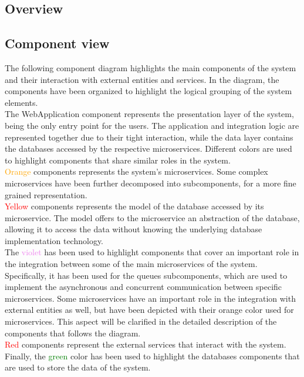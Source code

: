 \subsection{Overview}
\subsection{Component view}
The following component diagram highlights the main components of the system and their interaction with external entities and services. In the diagram, the components have 
been organized to highlight the logical grouping of the system elements.\\The WebApplication component represents the presentation layer of the system, being the only entry point for the users.
The application and integration logic are represented together due to their tight interaction, while the data layer contains the databases accessed by the respective microservices.
Different colors are used to highlight components that share similar roles in the system.\\ \textcolor{orange}{Orange} components represents the system's microservices. Some complex microservices have been further decomposed into subcomponents, for a more fine grained representation.\\
\textcolor{red}{Yellow} components represents the model of the database accessed by its microservice. The model offers to the microservice an abstraction of the database, allowing it to access the data without knowing the underlying database implementation technology.\\ 
The \textcolor{violet}{violet} has been used to highlight components that cover an important role in the integration between some of the main microservices of the system. Specifically, it has been used for the queues subcomponents, which are used to implement the asynchronous and concurrent communication between specific microservices.
Some microservices have an important role in the integration with external entities as well, but have been depicted with their orange color used for microservices. This aspect will be clarified in the detailed description of the components that follows the diagram.\\
\textcolor{red}{Red} components represent the external services that interact with the system.\\
Finally, the \textcolor{green}{green} color has been used to highlight the databases components that are used to store the data of the system.\\
